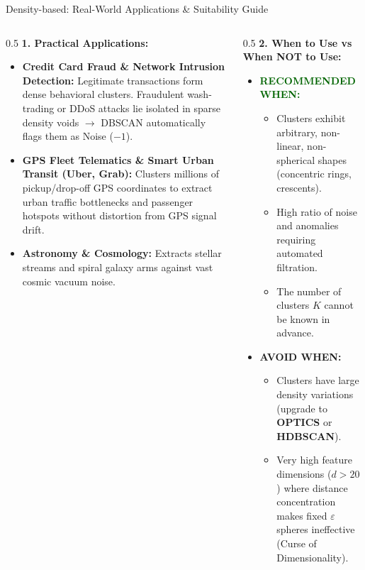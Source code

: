 \documentclass[aspectratio=169,10pt]{beamer}
\begin{document}
\begin{frame}{Density-based: Real-World Applications \& Suitability Guide}
  \footnotesize
  \begin{columns}[T]
    \begin{column}{0.5\textwidth}
      \textbf{1. Practical Applications:}
      \begin{itemize}\setlength{\itemsep}{2pt}
        \item \textbf{Credit Card Fraud \& Network Intrusion Detection:}
          Legitimate transactions form dense behavioral clusters. Fraudulent wash-trading or DDoS attacks lie isolated in sparse density voids $\to$ DBSCAN automatically flags them as Noise ($-1$).
        \item \textbf{GPS Fleet Telematics \& Smart Urban Transit (Uber, Grab):}
          Clusters millions of pickup/drop-off GPS coordinates to extract urban traffic bottlenecks and passenger hotspots without distortion from GPS signal drift.
        \item \textbf{Astronomy \& Cosmology:}
          Extracts stellar streams and spiral galaxy arms against vast cosmic vacuum noise.
      \end{itemize}
    \end{column}
    \begin{column}{0.5\textwidth}
      \textbf{2. When to Use vs When NOT to Use:}
      \begin{itemize}\setlength{\itemsep}{2pt}
        \item \textcolor{darkgreen}{\textbf{RECOMMENDED WHEN:}}
          \begin{itemize}
            \item Clusters exhibit arbitrary, non-linear, non-spherical shapes (concentric rings, crescents).
            \item High ratio of noise and anomalies requiring automated filtration.
            \item The number of clusters $K$ cannot be known in advance.
          \end{itemize}
        \item \textcolor{crimsonred}{\textbf{AVOID WHEN:}}
          \begin{itemize}
            \item Clusters have large density variations (upgrade to \textbf{OPTICS} or \textbf{HDBSCAN}).
            \item Very high feature dimensions ($d > 20$) where distance concentration makes fixed $\varepsilon$ spheres ineffective (Curse of Dimensionality).
          \end{itemize}
      \end{itemize}
    \end{column}
  \end{columns}
\end{frame}
\end{document}
